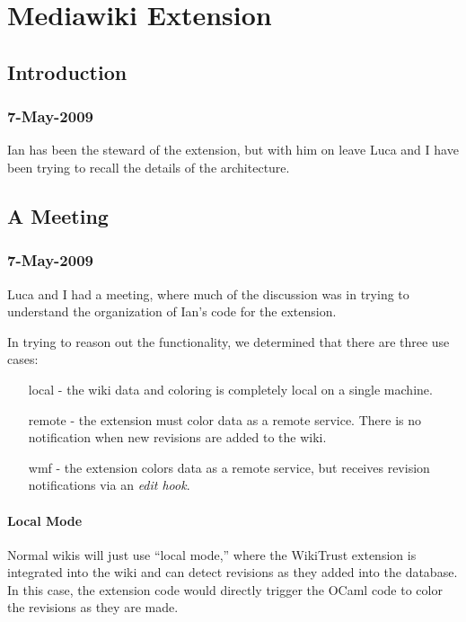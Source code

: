 \chapter{Mediawiki Extension}

\section{Introduction}

\subsection{7-May-2009}

Ian has been the steward of the 
extension, but with him on leave Luca and I have been
trying to recall the details of the architecture.

\section{A Meeting}

\subsection{7-May-2009}

Luca and I had a meeting, where much of the discussion was
in trying to understand the organization of Ian's code
for the extension.

In trying to reason out the functionality, we determined that
there are three use cases:
\begin{enumerate}
\item[local] - the wiki data and coloring is completely local on
	a single machine.
\item[remote] - the extension must color data as a remote service.
	There is no notification when new revisions are added to
	the wiki.
\item[wmf] - the extension colors data as a remote service,
	but receives revision notifications via an \textit{edit hook}.
\end{enumerate}

\subsubsection{Local Mode}

Normal wikis will just use ``local mode,'' where the WikiTrust extension
is integrated into the wiki and can detect revisions as they added
into the database.
In this case, the extension code would directly trigger the
OCaml code to color the revisions as they are made.

